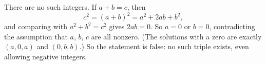 There are no such integers. If $a+b=c$, then
\[c^2=(a+b)^2=a^2+2ab+b^2 ,\]
and comparing with $a^2+b^2=c^2$ gives $2ab=0$. So $a=0$ or $b=0$, contradicting the assumption that $a$, $b$, $c$ are all nonzero. (The solutions with a zero are exactly $(a,0,a)$ and $(0,b,b)$.) So the statement is $\boxed{\text{false}}$: no such triple exists, even allowing negative integers.
